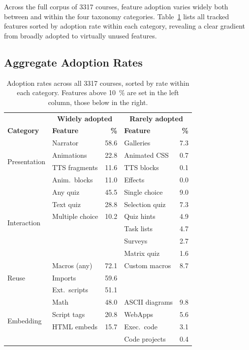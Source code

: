 Across the full corpus of \num{3317} courses, feature adoption varies
widely both between and within the four taxonomy categories.
Table~\ref{tab:adoption_overview} lists all tracked features sorted by
adoption rate within each category, revealing a clear gradient from
broadly adopted to virtually unused features.

\subsection{Aggregate Adoption Rates}

\begin{table}[ht]
  \centering
  \caption{Adoption rates across all \num{3317} courses, sorted by rate
           within each category.  Features above \SI{10}{\percent} are
           set in the left column, those below in the right.}
  \label{tab:adoption_overview}
  \begin{tabular}{@{}llr@{\qquad}lr@{}}
    \toprule
    & \multicolumn{2}{c}{\textbf{Widely adopted}} &
      \multicolumn{2}{c}{\textbf{Rarely adopted}} \\
    \textbf{Category} & \textbf{Feature} & \textbf{\%} &
      \textbf{Feature} & \textbf{\%} \\
    \midrule
    \multirow{4}{*}{\textcolor{catPresentation}{Presentation}}
      & Narrator        & 58.6 & Galleries      &  7.3 \\
      & Animations      & 22.8 & Animated CSS   &  0.7 \\
      & TTS fragments   & 11.6 & TTS blocks     &  0.1 \\
      & Anim.\ blocks   & 11.0 & Effects        &  0.0 \\
    \midrule
    \multirow{6}{*}{\textcolor{catInteraction}{Interaction}}
      & Any quiz        & 45.5 & Single choice  &  9.0 \\
      & Text quiz       & 28.8 & Selection quiz &  7.3 \\
      & Multiple choice & 10.2 & Quiz hints     &  4.9 \\
      &                 &      & Task lists     &  4.7 \\
      &                 &      & Surveys        &  2.7 \\
      &                 &      & Matrix quiz    &  1.6 \\
    \midrule
    \multirow{3}{*}{\textcolor{catReuse}{Reuse}}
      & Macros (any)    & 72.1 & Custom macros  &  8.7 \\
      & Imports         & 59.6 &                &      \\
      & Ext.\ scripts   & 51.1 &                &      \\
    \midrule
    \multirow{4}{*}{\textcolor{catEmbedding}{Embedding}}
      & Math            & 48.0 & ASCII diagrams &  9.8 \\
      & Script tags     & 20.8 & WebApps        &  5.6 \\
      & HTML embeds     & 15.7 & Exec.\ code    &  3.1 \\
      &                 &      & Code projects  &  0.4 \\
    \bottomrule
  \end{tabular}
\end{table}

